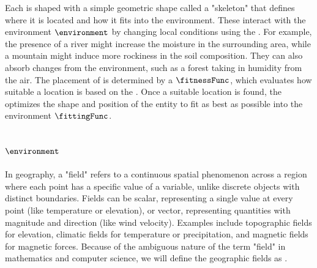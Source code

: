 Each  is shaped with a simple geometric shape called a "skeleton" that defines where it is located and how it fits into the environment.
These  interact with the environment $\environment$ by changing local conditions using the . For example, the presence of a river might increase the moisture in the surrounding area, while a mountain might induce more rockiness in the soil composition. They can also absorb changes from the environment, such as a forest taking in humidity from the air.
The placement of  is determined by a  $\fitnessFunc$, which evaluates how suitable a location is based on the . Once a suitable location is found, the  optimizes the shape and position of the entity to fit as best as possible into the environment $\fittingFunc$.




\subsection{ $\environment$}
\label{sec:semantic-representation_communication}

In geography, a "field" refers to a continuous spatial phenomenon across a region where each point has a specific value of a variable, unlike discrete objects with distinct boundaries. Fields can be scalar, representing a single value at every point (like temperature or elevation), or vector, representing quantities with magnitude and direction (like wind velocity). Examples include topographic fields for elevation, climatic fields for temperature or precipitation, and magnetic fields for magnetic forces. Because of the ambiguous nature of the term "field" in mathematics and computer science, we will define the geographic fields as .

